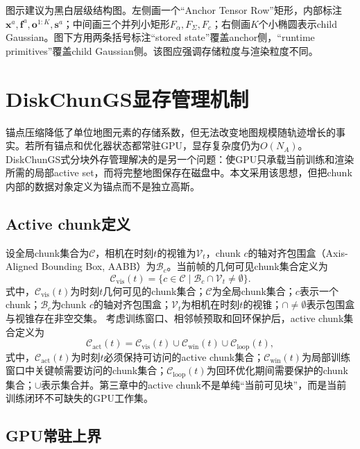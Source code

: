 图示建议为黑白层级结构图。左侧画一个``Anchor Tensor Row''矩形，内部标注$\mathbf{x}^a,\mathbf{f}^a,\mathbf{o}^{1:K},\mathbf{s}^a$；中间画三个并列小矩形$F_\alpha,F_\Sigma,F_c$；右侧画$K$个小椭圆表示child Gaussian。图下方用两条括号标注``stored state''覆盖anchor侧，``runtime primitives''覆盖child Gaussian侧。该图应强调存储粒度与渲染粒度不同。

\section{DiskChunGS显存管理机制}

锚点压缩降低了单位地图元素的存储系数，但无法改变地图规模随轨迹增长的事实。若所有锚点和优化器状态都常驻GPU，显存复杂度仍为$O(N_A)$。DiskChunGS式分块外存管理\cite{feldmann2026diskchungs}解决的是另一个问题：使GPU只承载当前训练和渲染所需的局部active set，而将完整地图保存在磁盘中。本文采用该思想，但把chunk内部的数据对象定义为锚点而不是独立高斯。

\subsection{Active chunk定义}

设全局chunk集合为$\mathcal{C}$，相机在时刻$t$的视锥为$\mathcal{V}_t$，chunk $c$的轴对齐包围盒（Axis-Aligned Bounding Box, AABB）为$\mathcal{B}_c$。当前帧的几何可见chunk集合定义为
\begin{equation}
\mathcal{C}_{\mathrm{vis}}(t)
=
\{c\in\mathcal{C}\mid \mathcal{B}_c\cap\mathcal{V}_t\neq\emptyset\}.
\end{equation}
式中，$\mathcal{C}_{\mathrm{vis}}(t)$为时刻$t$几何可见的chunk集合；$\mathcal{C}$为全局chunk集合；$c$表示一个chunk；$\mathcal{B}_c$为chunk $c$的轴对齐包围盒；$\mathcal{V}_t$为相机在时刻$t$的视锥；$\cap\neq\emptyset$表示包围盒与视锥存在非空交集。
考虑训练窗口、相邻帧预取和回环保护后，active chunk集合定义为
\begin{equation}
\mathcal{C}_{\mathrm{act}}(t)
=
\mathcal{C}_{\mathrm{vis}}(t)
\cup
\mathcal{C}_{\mathrm{win}}(t)
\cup
\mathcal{C}_{\mathrm{loop}}(t),
\end{equation}
式中，$\mathcal{C}_{\mathrm{act}}(t)$为时刻$t$必须保持可访问的active chunk集合；$\mathcal{C}_{\mathrm{win}}(t)$为局部训练窗口中关键帧需要访问的chunk集合；$\mathcal{C}_{\mathrm{loop}}(t)$为回环优化期间需要保护的chunk集合；$\cup$表示集合并。第三章中的active chunk不是单纯``当前可见块''，而是当前训练闭环不可缺失的GPU工作集。

\subsection{GPU常驻上界}

